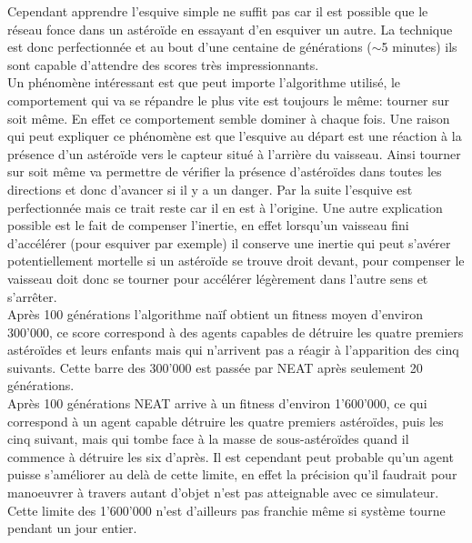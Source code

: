 \documentclass{article}
\begin{document}
Cependant apprendre l'esquive simple ne suffit pas car il est possible que le réseau fonce dans un astéroïde en essayant d'en esquiver un autre. La technique est donc perfectionnée et au bout d'une centaine de générations ($\sim$5 minutes) ils sont capable d'attendre des scores très impressionnants.\\

Un phénomène intéressant est que peut importe l'algorithme utilisé, le comportement qui va se répandre le plus vite est toujours le même: tourner sur soit même. En effet ce comportement semble dominer à chaque fois. Une raison qui peut expliquer ce phénomène est que l'esquive au départ est une réaction à la présence d'un astéroïde vers le capteur situé à l'arrière du vaisseau. Ainsi tourner sur soit même va permettre de vérifier la présence d'astéroïdes dans toutes les directions et donc d'avancer si il y a un danger. Par la suite l'esquive est perfectionnée mais ce trait reste car il en est à l'origine. Une autre explication possible est le fait de compenser l'inertie, en effet lorsqu'un vaisseau fini d'accélérer (pour esquiver par exemple) il conserve une inertie qui peut s'avérer potentiellement mortelle si un astéroïde se trouve droit devant, pour compenser le vaisseau doit donc se tourner pour accélérer légèrement dans l'autre sens et s'arrêter.\\

Après 100 générations l'algorithme naïf obtient un fitness moyen d'environ 300'000, ce score correspond à des agents capables de détruire les quatre premiers astéroïdes et leurs enfants mais qui n'arrivent pas a réagir à l'apparition des cinq suivants. Cette barre des 300'000 est passée par NEAT après seulement 20 générations.\\

Après 100 générations NEAT arrive à un fitness d'environ 1'600'000, ce qui correspond à un agent capable détruire les quatre premiers astéroïdes, puis les cinq suivant, mais qui tombe face à la masse de sous-astéroïdes quand il commence à détruire les six d'après. Il est cependant peut probable qu'un agent puisse s'améliorer au delà de cette limite, en effet la précision qu'il faudrait pour manoeuvrer à travers autant d'objet n'est pas atteignable avec ce simulateur. Cette limite des 1'600'000 n'est d'ailleurs pas franchie même si système tourne pendant un jour entier.\\
\end{document}
